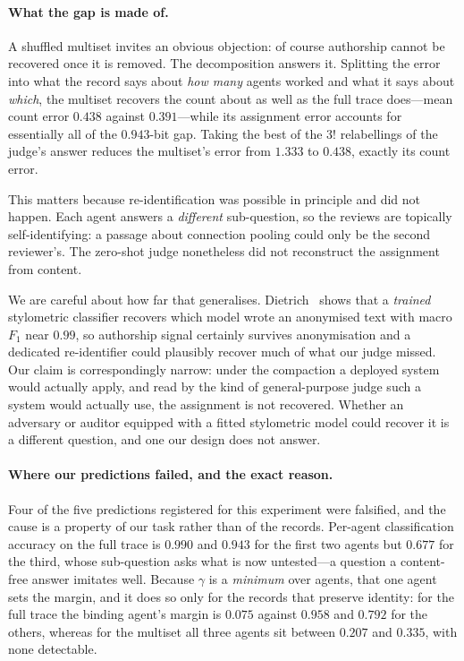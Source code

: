 \paragraph{What the gap is made of.}
A shuffled multiset invites an obvious objection: of course authorship cannot be
recovered once it is removed. The decomposition answers it. Splitting the error
into what the record says about \emph{how many} agents worked and what it says
about \emph{which}, the multiset recovers the count about as well as the full
trace does---mean count error $0.438$ against $0.391$---while its assignment
error accounts for essentially all of the $0.943$-bit gap. Taking the best of the
$3!$ relabellings of the judge's answer reduces the multiset's error from $1.333$
to $0.438$, exactly its count error.

This matters because re-identification was possible in principle and did not
happen. Each agent answers a \emph{different} sub-question, so the reviews are
topically self-identifying: a passage about connection pooling could only be the
second reviewer's. The zero-shot judge nonetheless did not reconstruct the
assignment from content.

We are careful about how far that generalises. Dietrich~\cite{dietrich2026peers}
shows that a \emph{trained} stylometric classifier recovers which model wrote an
anonymised text with macro $F_1$ near $0.99$, so authorship signal certainly
survives anonymisation and a dedicated re-identifier could plausibly recover much
of what our judge missed. Our claim is correspondingly narrow: under the
compaction a deployed system would actually apply, and read by the kind of
general-purpose judge such a system would actually use, the assignment is not
recovered. Whether an adversary or auditor equipped with a fitted stylometric
model could recover it is a different question, and one our design does not
answer.

\paragraph{Where our predictions failed, and the exact reason.}
Four of the five predictions registered for this experiment were falsified, and
the cause is a property of our task rather than of the records. Per-agent
classification accuracy on the full trace is $0.990$ and $0.943$ for the first
two agents but $0.677$ for the third, whose sub-question asks what is now
untested---a question a content-free answer imitates well. Because $\gamma$ is a
\emph{minimum} over agents, that one agent sets the margin, and it does so only
for the records that preserve identity: for the full trace the binding agent's
margin is $0.075$ against $0.958$ and $0.792$ for the others, whereas for the
multiset all three agents sit between $0.207$ and $0.335$, with none detectable.

